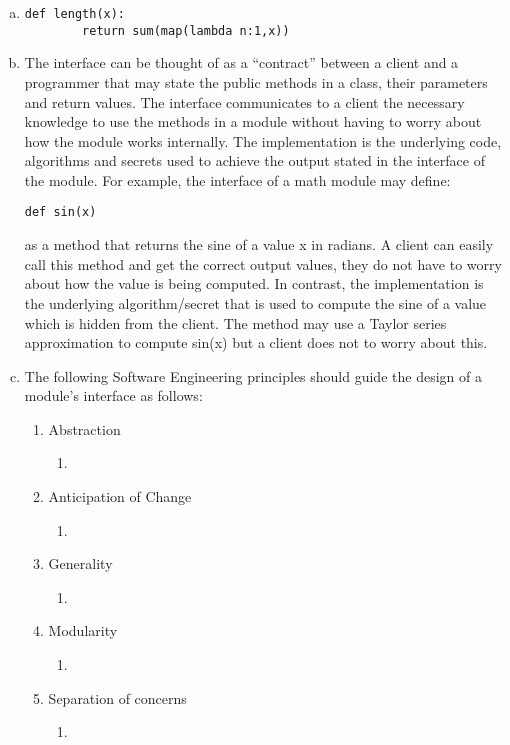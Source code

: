 \documentclass[12pt]{article}
\begin{document}
\begin{enumerate}[a)]
\item \begin{verbatim}
def length(x):
        return sum(map(lambda n:1,x))
\end{verbatim}

\item The interface can be thought of as a ``contract'' between a client and a programmer that may state the public methods in a class, their parameters and return values. The interface communicates to a client the necessary knowledge to use the methods in a module without having to worry about how the module works internally. The implementation is the underlying code, algorithms and secrets used to achieve the output stated in the interface of the module. For example, the interface of a math module may define: \begin{verbatim}
def sin(x)
\end{verbatim} as a method that returns the sine of a value x in radians. A client can easily call this method and get the correct output values, they do not have to worry about how the value is being computed. In contrast, the implementation is the underlying algorithm/secret that is used to compute the sine of a value which is hidden from the client. The method may use a Taylor series approximation to compute sin(x) but a client does not to worry about this.

\item The following Software Engineering principles should guide the design of a module's interface as follows:
	\begin{enumerate}
	
		\item Abstraction
			\begin{enumerate}
					\item 
			\end{enumerate}
			
		\item Anticipation of Change
			\begin{enumerate}
					\item 
			\end{enumerate}
		
		\item Generality
			\begin{enumerate}
					\item 
			\end{enumerate}
			
		\item Modularity
			\begin{enumerate}
					\item 
			\end{enumerate}
			
		\item Separation of concerns
			\begin{enumerate}
					\item 
			\end{enumerate}
	\end{enumerate}
  
\end{enumerate}
\end{document}
